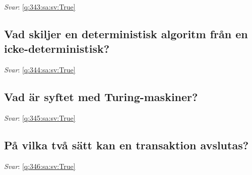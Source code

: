 \documentclass[a4paper,11pt,oneside]{article}
\begin{document}
\begin{sloppypar}
\label{q:343:sa:sv:False}

\vspace{2cm}

\noindent\makebox[\textwidth]{\hrulefill}

\vspace{1cm}

\textit{Svar}: \autoref{q:343:sa:sv:True}



\subsection{Vad skiljer en deterministisk algoritm fr\r{a}n en icke-deterministisk?}

\label{q:344:sa:sv:False}

\vspace{2cm}

\noindent\makebox[\textwidth]{\hrulefill}

\vspace{1cm}

\textit{Svar}: \autoref{q:344:sa:sv:True}



\subsection{Vad \"ar syftet med Turing-maskiner?}

\label{q:345:sa:sv:False}

\vspace{2cm}

\noindent\makebox[\textwidth]{\hrulefill}

\vspace{1cm}

\textit{Svar}: \autoref{q:345:sa:sv:True}



\subsection{P\r{a} vilka tv\r{a} s\"att kan en transaktion avslutas?}

\label{q:346:sa:sv:False}

\vspace{2cm}

\noindent\makebox[\textwidth]{\hrulefill}

\vspace{1cm}

\textit{Svar}: \autoref{q:346:sa:sv:True}




\end{sloppypar}
\end{document}

